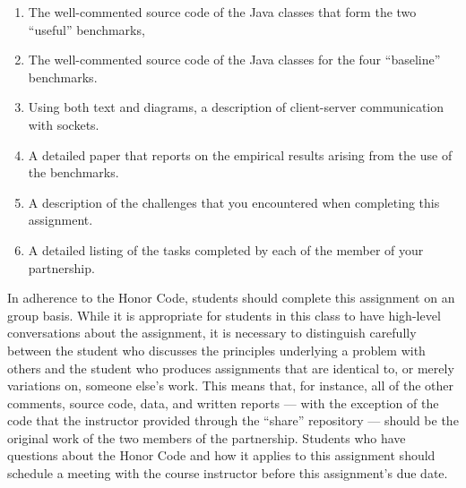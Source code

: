 \vspace*{-.15in}

\begin{enumerate}
  \itemsep 0em

    \item The well-commented source code of the Java classes that form the two ``useful'' benchmarks,

    \item The well-commented source code of the Java classes for the four ``baseline'' benchmarks.

    \item Using both text and diagrams, a description of client-server communication with sockets.

    \item A detailed paper that reports on the empirical results arising from the use of the benchmarks.

    \item A description of the challenges that you encountered when completing this assignment.

    \item A detailed listing of the tasks completed by each of the member of your partnership.

\end{enumerate}

\vspace*{-.15in}


In adherence to the Honor Code, students should complete this assignment on an group basis. While it is appropriate for
students in this class to have high-level conversations about the assignment, it is necessary to distinguish carefully
between the student who discusses the principles underlying a problem with others and the student who produces
assignments that are identical to, or merely variations on, someone else's work.  This means that, for instance, all of
the other comments, source code, data, and written reports --- with the exception of the code that the instructor
provided through the ``share'' repository --- should be the original work of the two members of the partnership.
Students who have questions about the Honor Code and how it applies to this assignment should schedule a meeting with
the course instructor before this assignment's due date.


